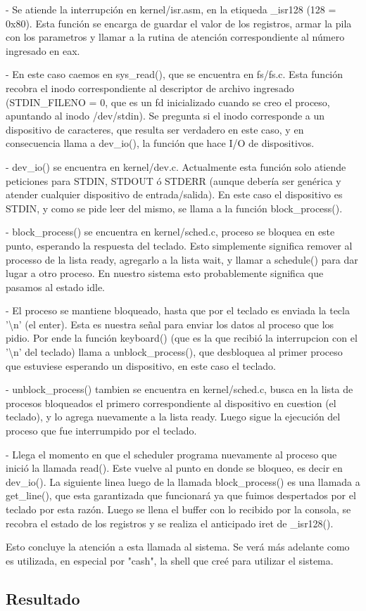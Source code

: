 - Se atiende la interrupción en kernel/isr.asm, en la etiqueda \_isr128 (128
= 0x80). Esta función se encarga de guardar el valor de los registros, armar
la pila con los parametros y llamar a la rutina de atención correspondiente
al número ingresado en eax.

- En este caso caemos en sys\_read(), que se encuentra en fs/fs.c. Esta función
recobra el inodo correspondiente al descriptor de archivo ingresado
(STDIN\_FILENO = 0, que es un fd inicializado cuando se creo el proceso,
apuntando al inodo /dev/stdin). Se pregunta si el inodo corresponde a un
dispositivo de caracteres, que resulta ser verdadero en este caso, y en
consecuencia llama a dev\_io(), la función que hace I/O de dispositivos.

- dev\_io() se encuentra en kernel/dev.c. Actualmente esta función solo atiende
peticiones para STDIN, STDOUT ó STDERR (aunque debería ser genérica y atender
cualquier dispositivo de entrada/salida). En este caso el dispositivo es STDIN,
y como se pide leer del mismo, se llama a la función block\_process().

- block\_process() se encuentra en kernel/sched.c, proceso se bloquea en este
punto, esperando la respuesta del teclado. Esto simplemente significa remover
al processo de la lista ready, agregarlo a la lista wait, y llamar a schedule()
para dar lugar a otro proceso. En nuestro sistema esto probablemente significa
que pasamos al estado idle.

- El proceso se mantiene bloqueado, hasta que por el teclado es enviada la
tecla '\textbackslash n' (el enter). Esta es nuestra señal para enviar los
datos al proceso que los pidio. Por ende la función keyboard() (que es la
que recibió la interrupcion con el '\textbackslash n' del teclado) llama a
unblock\_process(), que desbloquea al primer proceso que estuviese esperando
un dispositivo, en este caso el teclado.

- unblock\_process() tambien se encuentra en kernel/sched.c, busca en la lista
de procesos bloqueados el primero correspondiente al dispositivo en cuestion
(el teclado), y lo agrega nuevamente a la lista ready. Luego sigue la ejecución
del proceso que fue interrumpido por el teclado.

- Llega el momento en que el scheduler programa nuevamente al proceso que
inició la llamada read(). Este vuelve al punto en donde se bloqueo, es decir en
dev\_io(). La siguiente linea luego de la llamada block\_process() es una
llamada a get\_line(), que esta garantizada que funcionará ya que fuimos
despertados por el teclado por esta razón. Luego se llena el buffer con lo
recibido por la consola, se recobra el estado de los registros y se realiza el
anticipado iret de \_isr128().

Esto concluye la atención a esta llamada al sistema. Se verá más adelante como
es utilizada, en especial por "cash", la shell que creé para utilizar el
sistema.

\subsection{Resultado}
